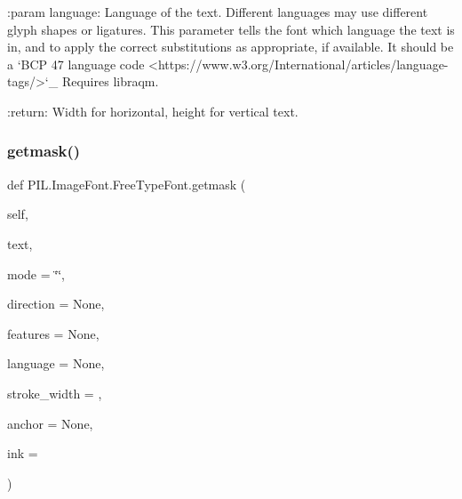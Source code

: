\begin{DoxyVerb}
:param language: Language of the text. Different languages may use
         different glyph shapes or ligatures. This parameter tells
         the font which language the text is in, and to apply the
         correct substitutions as appropriate, if available.
         It should be a `BCP 47 language code
         <https://www.w3.org/International/articles/language-tags/>`_
         Requires libraqm.

:return: Width for horizontal, height for vertical text.
\end{DoxyVerb}
 \mbox{\label{classPIL_1_1ImageFont_1_1FreeTypeFont_a3f9e384dff68e9d03985fa76c7c31a11}} 
\subsubsection{\texorpdfstring{getmask()}{getmask()}}
{\footnotesize\ttfamily def P\+I\+L.\+Image\+Font.\+Free\+Type\+Font.\+getmask (\begin{DoxyParamCaption}\item[{}]{self,  }\item[{}]{text,  }\item[{}]{mode = {\ttfamily \char`\"{}\char`\"{}},  }\item[{}]{direction = {\ttfamily None},  }\item[{}]{features = {\ttfamily None},  }\item[{}]{language = {\ttfamily None},  }\item[{}]{stroke\+\_\+width = {},  }\item[{}]{anchor = {\ttfamily None},  }\item[{}]{ink = {} }\end{DoxyParamCaption})}

